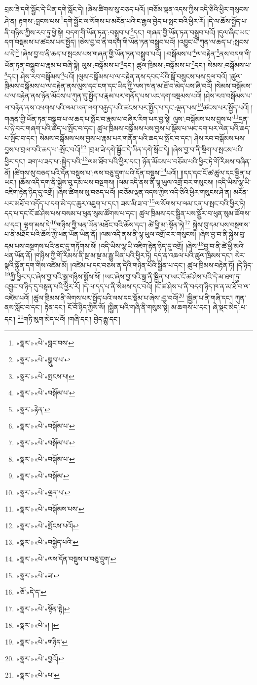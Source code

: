 བྲམ་ཟེ་དགེ་སྦྱོང་དེ་ཡིན་དགེ་སློང་དེ། །ཞེས་ཚིགས་སུ་བཅད་པའོ། །བཅོམ་ལྡན་འདས་ཀྱིས་འདི་ཅིའི་ཕྱིར་གསུངས་ཤེ་ན། རྟགས་:བླངས་པས་\footnote{«སྣར་»«པེ་»བླང་བས་}དགེ་སྦྱོང་ལ་སོགས་པ་མངོན་པའི་ང་རྒྱལ་བྱེད་པ་སྤང་བའི་ཕྱིར་རོ། །དེ་ལ་ཆོས་སྤྱོད་པ་ནི་གཉིས་ཀྱིས་རབ་ཏུ་ཕྱེ་སྟེ། བདག་གི་ཡོན་ཏན་:བསྒྲུབ་པ་\footnote{«སྣར་»«པེ་»སྒྲུབ་པ་}དང་། གཞན་གྱི་ཡོན་ཏན་བསྒྲུབ་པའོ། །དུལ་ཞིང་ཡང་དག་བསྡམས་པ་ཚངས་པར་སྤྱོད། །ཅེས་བྱ་བ་ནི་བདག་གི་ཡོན་ཏན་བསྒྲུབ་པའོ། །འབྱུང་པོ་ཀུན་ལ་ཆད་པ་:སྤངས་པ་དེ།\footnote{«སྣར་»«པེ་»སྤངས་པ།} །ཞེས་བྱ་བ་ནི་ཆད་པ་སྤངས་པས་གཞན་གྱི་ཡོན་ཏན་བསྒྲུབ་པའོ། །:བསྒོམས་པ་\footnote{«སྣར་»«པེ་»བསྒོམ་པ་}ལ་བརྟེན་\footnote{«སྣར་»རྟེན་}ནས་བདག་གི་ཡོན་ཏན་བསྒྲུབ་པ་རྣམ་པ་བཞི་སྟེ། ལུས་:བསྒོམས་པ་\footnote{«སྣར་»«པེ་»བསྒོམ་པ་}དང་། ཚུལ་ཁྲིམས་:བསྒོམས་པ་\footnote{«སྣར་»«པེ་»བསྒོམ་པ་}དང་། སེམས་:བསྒོམས་པ་\footnote{«སྣར་»«པེ་»བསྒོམ་པ་}དང་། ཤེས་རབ་བསྒོམས་\footnote{«སྣར་»«པེ་»བསྒོམ་}པའོ། །ལུས་བསྒོམས་པ་ལ་བརྟེན་ནས་དབང་པོའི་སྒོ་བསྲུངས་པས་དུལ་བའོ། །ཚུལ་ཁྲིམས་བསྒོམས་པ་ལ་བརྟེན་ནས་ལུས་དང་ངག་དང་ཡིད་ཀྱི་ལས་ཁ་ན་མ་ཐོ་བ་མེད་པས་ཞི་བའོ། །སེམས་བསྒོམས་པ་ལ་བརྟེན་ནས་ཉོན་མོངས་པ་ཀུན་དུ་སྤྱོད་པ་རྣམ་པར་གནོད་པས་ཡང་དག་བསྡམས་པའོ། །ཤེས་རབ་བསྒོམས་པ་ལ་བརྟེན་ནས་འཕགས་པའི་ལམ་ཡན་ལག་བརྒྱད་པའི་ཚངས་པར་སྤྱོད་པ་དང་:ལྡན་པས་\footnote{«སྣར་»«པེ་»ལྡན་པ་}ཚངས་པར་སྤྱོད་པའོ། །གཞན་གྱི་ཡོན་ཏན་བསྒྲུབ་པ་ལ་ཆད་པ་སྤོང་བ་རྣམ་པ་བཞིར་རིག་པར་བྱ་སྟེ། ལུས་:བསྒོམས་པས་བྱས་པ་\footnote{«སྣར་»«པེ་»བསྒོམས་པས་}དྲན་པ་ཉེ་བར་གཞག་པའི་ཆད་པ་སྤོང་བ་དང་། ཚུལ་ཁྲིམས་བསྒོམས་པས་བྱས་པ་སྡོམ་པ་ཡང་དག་པར་ལེན་པའི་ཆད་པ་སྤོང་བ་དང་། སེམས་བསྒོམས་པས་བྱས་པ་རྣམ་པར་གནོན་པའི་ཆད་པ་སྤོང་བ་དང་། ཤེས་རབ་བསྒོམས་པས་བྱས་པ་བྲལ་བའི་ཆད་པ་:སྤོང་བའོ།\footnote{«སྣར་»«པེ་»སྤོངས་པའོ།} །བྲམ་ཟེ་དགེ་སྦྱོང་དེ་ཡིན་དགེ་སློང་དེ། །ཞེས་བྱ་བ་ནི་སྡིག་པ་སྤངས་པའི་ཕྱིར་དང་། ཟག་པ་ཟད་པ་:སྐྱེད་པའི་\footnote{«སྣར་»«པེ་»བསྐྱེད་པའི་}ལམ་ཐོབ་པའི་ཕྱིར་དང་། ཉོན་མོངས་པ་བཅོམ་པའི་ཕྱིར་ཏེ་གོ་རིམས་བཞིན་ནོ། །ཚིགས་སུ་བཅད་པའི་དོན་བསྡུས་པ་:ལས་བཅུ་དྲུག་པའི་དོན་བསྡུས་\footnote{«སྣར་»«པེ་»ལས་དོན་བསྡུས་པ་བཅུ་དྲུག་}པའོ།། །།དད་དང་ངོ་ཚ་ཚུལ་དང་སྦྱིན་པ་ཡང་། །ཆོས་འདི་དག་ནི་སྐྱེས་བུ་དམ་པས་བསྔགས། །ལམ་འདི་ནས་ནི་ལྷ་ཡུལ་འགྲོ་བར་གསུངས། །འདི་ཡིས་ལྷ་ཡི་འཇིག་རྟེན་ཉིད་དུ་འགྲོ། །ཞེས་ཚིགས་སུ་བཅད་པའོ། །བཅོམ་ལྡན་འདས་ཀྱིས་འདི་ཅིའི་ཕྱིར་གསུངས་ཤེ་ན། མངོན་པར་མཐོ་བ་འདོད་པ་དག་མེ་དང་ཆུར་འཇུག་པ་དང་། ཟས་མི་ཟ་བ་\footnote{«སྣར་»«པེ་»ཟ་}ལ་སོགས་པ་ལམ་ངན་པ་སྤང་བའི་ཕྱིར་ཏེ། དད་པ་དང་ངོ་ཚ་ཤེས་པས་བསམ་པ་ཕུན་སུམ་ཚོགས་པ་དང་། ཚུལ་ཁྲིམས་དང་སྦྱིན་པས་སྦྱོར་བ་ཕུན་སུམ་ཚོགས་པ་དང་། ལྷག་མས་དེ་\footnote{«ཅོ་»དེ་ད་}གཉིས་ཀྱི་ཕན་ཡོན་མཐོང་བའི་ཆོས་དང་། ཚེ་ཕྱི་མ་:སྟོན་ཏེ།\footnote{«སྣར་»«པེ་»སྟོན་སྟེ།} སྐྱེས་བུ་དམ་པས་བསྔགས་པ་ནི་མཐོང་པའི་ཆོས་ཀྱི་ཕན་ཡོན་ཡིན་ནོ། །ལམ་འདི་ནས་ནི་ལྷ་ཡུལ་འགྲོ་བར་གསུངས། །ཞེས་བྱ་བ་ནི་སྐྱེས་བུ་དམ་པས་བསྔགས་པའི་ནང་དུ་གཏོགས་སོ། །འདི་ཡིས་ལྷ་ཡི་འཇིག་རྟེན་ཉིད་དུ་འགྲོ། །ཞེས་\footnote{«སྣར་»«པེ་»། །}བྱ་བ་ནི་ཚེ་ཕྱི་མའི་ཕན་ཡོན་ནོ། །གཉིས་ཀྱི་གོ་རིམས་ནི་སྔ་མ་སྔ་མ་རྒྱུ་ཡིན་པའི་ཕྱིར་ཏེ། དད་ན་འཆལ་པའི་ཚུལ་ཁྲིམས་དང་། སེར་སྣའི་སྐྱོན་དག་གིས་འཛེམ་མོ། །འཛེམ་པ་དང་བཅས་ན་དེའི་གཉེན་པོའི་སྦྱིན་པ་དང་། ཚུལ་ཁྲིམས་བརྟེན་ཏོ། །དེ་ཉིད་\footnote{«སྣར་»«པེ་»གཉིད་}ཀྱི་ཕྱིར་དང་ཞེས་བྱ་བའི་སྒྲ་གཉིས་སྨོས་སོ། །ཡང་ཞེས་བྱ་བའི་སྒྲ་ནི་སྦྱིན་པ་ཡང་ངོ་ཚ་ཤེས་པའི་དེ་མ་ཐག་ཏུ་འབྱུང་བ་ཉིད་དུ་བསྟན་པའི་ཕྱིར་རོ། །དེ་ལ་དད་པ་ནི་སེམས་དང་བའོ། །ངོ་ཚ་ཤེས་པ་ནི་བདག་ཉིད་ཁ་ན་མ་ཐོ་བ་ལ་འཛེམ་པའོ། །ཚུལ་ཁྲིམས་ནི་ལེགས་པར་སྤྱོད་པའི་ལས་དང་སྡོམ་པ་ཞེས་:བྱ་བའོ།\footnote{«སྣར་»«པེ་»བྱའོ།} །སྦྱིན་པ་ནི་གཞི་དང་། ཀུན་ནས་སློང་བ་དང་། རྟེན་དང་། ངོ་བོ་ཉིད་ཀྱིས་སོ། །སྦྱིན་པའི་གཞི་ནི་གསུམ་སྟེ། མ་ཆགས་པ་དང་། ཞེ་སྡང་མེད་:པ་དང་། \footnote{«སྣར་»«པེ་»པ་}གཏི་མུག་མེད་པའོ། །གཞི་དང་། བྱེད་རྒྱུ་དང་། 